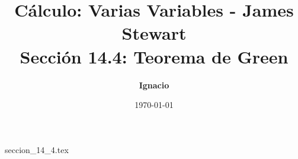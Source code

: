 \documentclass[11pt,spanish,oneside]{report}
\title{\textbf{Cálculo: Varias Variables - James Stewart} \\ \Large Sección 14.4: Teorema de Green}
\author{\textbf{Ignacio}}
\date{\today}
\begin{document}
\maketitle

{seccion_14_4.tex}
\end{document}
